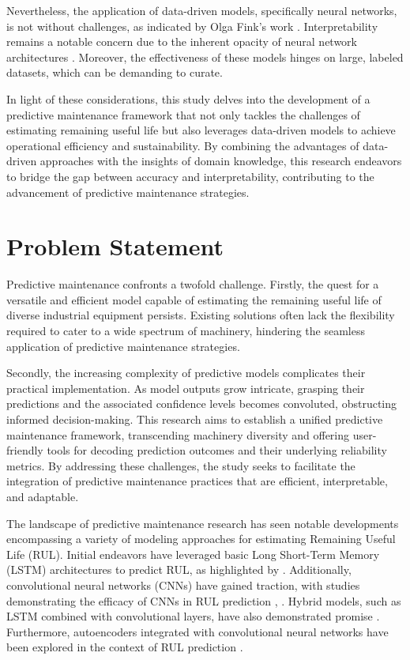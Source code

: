 \documentclass{IEEEtran}
\begin{document}
        Nevertheless, the application of data-driven models, specifically neural networks, is not without challenges, as indicated by Olga Fink's work \cite{Fink2020}. Interpretability remains a notable concern due to the inherent opacity of neural network architectures \cite{Rojat2021}. Moreover, the effectiveness of these models hinges on large, labeled datasets, which can be demanding to curate.

        In light of these considerations, this study delves into the development of a predictive maintenance framework that not only tackles the challenges of estimating remaining useful life but also leverages data-driven models to achieve operational efficiency and sustainability. By combining the advantages of data-driven approaches with the insights of domain knowledge, this research endeavors to bridge the gap between accuracy and interpretability, contributing to the advancement of predictive maintenance strategies.

    \section{Problem Statement}

        Predictive maintenance confronts a twofold challenge. Firstly, the quest for a versatile and efficient model capable of estimating the remaining useful life of diverse industrial equipment persists. Existing solutions often lack the flexibility required to cater to a wide spectrum of machinery, hindering the seamless application of predictive maintenance strategies.

        Secondly, the increasing complexity of predictive models complicates their practical implementation. As model outputs grow intricate, grasping their predictions and the associated confidence levels becomes convoluted, obstructing informed decision-making. This research aims to establish a unified predictive maintenance framework, transcending machinery diversity and offering user-friendly tools for decoding prediction outcomes and their underlying reliability metrics. By addressing these challenges, the study seeks to facilitate the integration of predictive maintenance practices that are efficient, interpretable, and adaptable.

        The landscape of predictive maintenance research has seen notable developments encompassing a variety of modeling approaches for estimating Remaining Useful Life (RUL). Initial endeavors have leveraged basic Long Short-Term Memory (LSTM) architectures to predict RUL, as highlighted by \cite{lstm-stat-features}. Additionally, convolutional neural networks (CNNs) have gained traction, with studies demonstrating the efficacy of CNNs in RUL prediction \cite{phm2021-2nd-inception}, \cite{phm2021-3rd-stacked-cnn} \cite{phm2021-1st-cnn}. Hybrid models, such as LSTM combined with convolutional layers, have also demonstrated promise \cite{zhao2020double} \cite{peng2021remaining}. Furthermore, autoencoders integrated with convolutional neural networks have been explored in the context of RUL prediction \cite{rul-saetcn}.
\end{document}
